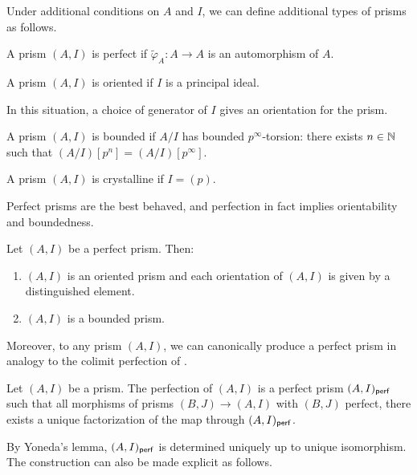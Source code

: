 Under additional conditions on $A$ and $I$, we can define additional types of prisms as follows. 
\begin{definition}\label{def: perfect prism}
    A prism $(A,I)$ is perfect if $\widetilde{\varphi}_{A}:A\to A$ is an automorphism of $A$. 
\end{definition}
\begin{definition}\label{def: oriented prism}
    A prism $(A,I)$ is oriented if $I$ is a principal ideal. 
\end{definition}
\begin{remark}
    In this situation, a choice of generator of $I$ gives an orientation for the prism. 
\end{remark}
\begin{definition}\label{def: bounded prism}
    A prism $(A,I)$ is bounded if $A/I$ has bounded $p^{\infty}$-torsion: there exists $n\in\mathbb{N}$ such that $(A/I)[p^{n}]=(A/I)[p^{\infty}]$. 
\end{definition}
\begin{definition}\label{def: crystalline prism}
    A prism $(A,I)$ is crystalline if $I=(p)$.
\end{definition}
Perfect prisms are the best behaved, and perfection in fact implies orientability and boundedness. 
\begin{proposition}\label{prop: perfect implies orientable and bounded}
    Let $(A,I)$ be a perfect prism. Then:
    \begin{enumerate}[label=(\roman*)]
        \item $(A,I)$ is an oriented prism and each orientation of $(A,I)$ is given by a distinguished element. 
        \item $(A,I)$ is a bounded prism. 
    \end{enumerate}
\end{proposition}
Moreover, to any prism $(A,I)$, we can canonically produce a perfect prism in analogy to the colimit perfection of . 
\begin{definition}\label{def: perfection of a prism}
    Let $(A,I)$ be a prism. The perfection of $(A,I)$ is a perfect prism $(A,I)_{\mathsf{perf}}$ such that all morphisms of prisms $(B,J)\to(A,I)$ with $(B,J)$ perfect, there exists a unique factorization of the map through $(A,I)_{\mathsf{perf}}$. 
\end{definition}
By Yoneda's lemma, $(A,I)_{\mathsf{perf}}$ is determined uniquely up to unique isomorphism. The construction can also be made explicit as follows. 
